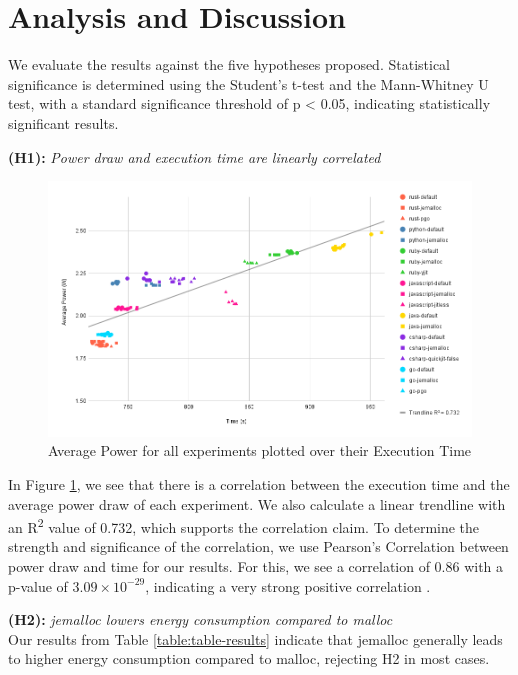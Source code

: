 \documentclass[main.tex]{subfiles}
\begin{document}
\section{Analysis and Discussion}

We evaluate the results against the five hypotheses proposed. Statistical significance is determined using the Student's t-test and the Mann-Whitney U test, with a standard significance threshold of p < 0.05, indicating statistically significant results.

\textbf{(H1):} \emph{Power draw and execution time are linearly correlated}
\\
\begin{figure}[h]
    \centering
    \includegraphics[width=\linewidth]{media/analysis/AveragePowerOverTime.png}
    \caption{Average Power for all experiments plotted over their Execution Time}
    \label{fig:analysis-energy-time-correlation}
\end{figure}

In Figure \ref{fig:analysis-energy-time-correlation}, we see that there is a correlation between the execution time and the average power draw of each experiment. We also calculate a linear trendline with an R\textsuperscript{2} value of 0.732, which supports the correlation claim. To determine the strength and significance of the correlation, we use Pearson's Correlation between power draw and time for our results. For this, we see a correlation of 0.86 with a p-value of $3.09\times 10^{-29}$, indicating a very strong positive correlation  \cite{pearson-correlation-table}.

\textbf{(H2):} \emph{jemalloc lowers energy consumption compared to malloc}
\\
Our results from Table \ref{table:table-results} indicate that jemalloc generally leads to higher energy consumption compared to malloc, rejecting H2 in most cases.
\end{document}

